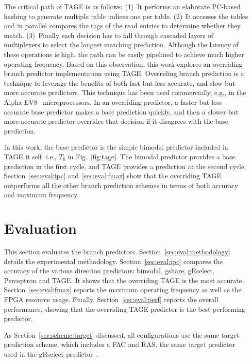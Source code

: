 \documentclass[conference]{IEEEtran}
\begin{document}
The critical path of TAGE is as follows: (1)~It performs an elaborate PC-based hashing to generate multiple table indices one per table. (2)~It accesses the tables and in parallel compares the tags of the read entries to determine whether they match. (3)~Finally each decision has to fall through cascaded layers of multiplexers to select the longest matching prediction. Although the latency of these operations is high, the path can be easily pipelined to achieve much higher operating frequency. Based on this observation, this work explores an overriding branch predictor implementation using TAGE. Overriding branch prediction is a technique to leverage the benefits of both fast but less accurate, and slow but more accurate predictors. This technique has been used commercially, e.g., in the Alpha EV8~\cite{alphaEV8} microprocessors. In an overriding predictor, a faster but less accurate base predictor makes a base prediction quickly, and then a slower but more accurate predictor overrides that decision if it disagrees with the base prediction. 

In this work, the base predictor is the simple bimodal predictor included in TAGE it self, i.e., $T_0$ in Fig.~\ref{fig:tage}. The bimodal predictor provides a base prediction in the first cycle, and TAGE provides a prediction at the second cycle. Section~\ref{sec:eval:ipc} and~\ref{sec:eval:fmax} show that the overriding TAGE outperforms all the other branch prediction schemes in terms of both accuracy and maximum frequency.

\section{Evaluation}
\label{sec:eval}
This section evaluates the branch predictors. Section~\ref{sec:eval:methodology} details the experimental methodology. Section~\ref{sec:eval:ipc} compares the accuracy of the various direction predictors: bimodal, gshare, gRselect, Perceptron and TAGE. It shows that the overriding TAGE is the most accurate. Section~\ref{sec:eval:fmax} reports the maximum operating frequency as well as the FPGA resource usage. Finally, Section~\ref{sec:eval:perf} reports the overall performance, showing that the overriding TAGE predictor is the best performing predictor.

As Section~\ref{sec:scheme:target} discussed, all configurations use the same target prediction scheme, which includes a FAC and RAS, the same target predictor used in the gRselect predictor~\cite{grselect}.
\end{document}
